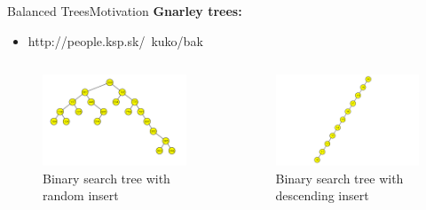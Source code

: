 \begin{frame}{Balanced Trees}{Motivation}
  \textbf{Gnarley trees:}\hfill
  \qrcode[height=5em]{\GnarleyTreesLink}\\
    \begin{itemize}
    \item http://people.ksp.sk/~kuko/bak
    \end{itemize}  
  \vspace{-1.0em}
  \begin{columns}
    \begin{column}[t]{0.5\linewidth}
      \begin{figure}
        \includegraphics[width=\linewidth]{Images/Motivation/BinarySearchTree_Random.png}
        \caption{Binary search tree with random insert~\cite{gnarley_trees}}
        \label{fig:motivation:binary_search_tree_random}
      \end{figure}
    \end{column}
    \begin{column}[t]{0.5\linewidth}
      \begin{figure}
        \includegraphics[width=\linewidth]{Images/Motivation/BinarySearchTree_Ordered.png}
        \caption{Binary search tree with descending insert~\cite{gnarley_trees}}
        \label{fig:motivation:binary_search_tree_ordered}
      \end{figure}
    \end{column}
  \end{columns}
 
\end{frame}

